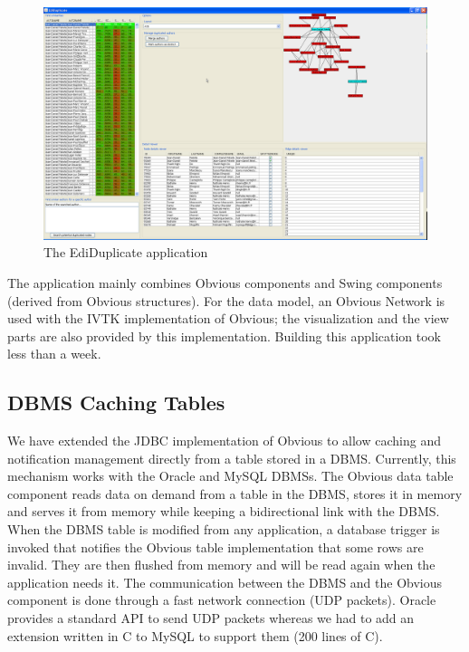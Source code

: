 \begin{figure}[!h]
\includegraphics[width=\columnwidth]{figures/ediduplicate}
\caption{The EdiDuplicate application}
\label{fig:ediduplicate}
\end{figure}

The application mainly combines Obvious components and Swing
components (derived from Obvious structures). For the data model, an
Obvious Network is used with the IVTK implementation of Obvious; the
visualization and the view parts are also provided by this
implementation.  Building this application took less than a week.

\subsection{DBMS Caching Tables}
\label{dbmscachingtable}

We have extended the JDBC implementation of Obvious to allow caching
and notification management directly from a table stored in a DBMS.
Currently, this mechanism works with the Oracle and MySQL DBMSs.  The
Obvious data table component reads data on demand from a table in the
DBMS, stores it in memory and serves it from memory while keeping a
bidirectional link with the DBMS.  When the DBMS table is modified
from any application, a database trigger is invoked that notifies the
Obvious table implementation that some rows are invalid.  They are
then flushed from memory and will be read again when the application
needs it.  The communication between the DBMS and the Obvious
component is done through a fast network connection (UDP packets).
Oracle provides a standard API to send UDP packets whereas we had to
add an extension written in C to MySQL to support them (200 lines of
C).

